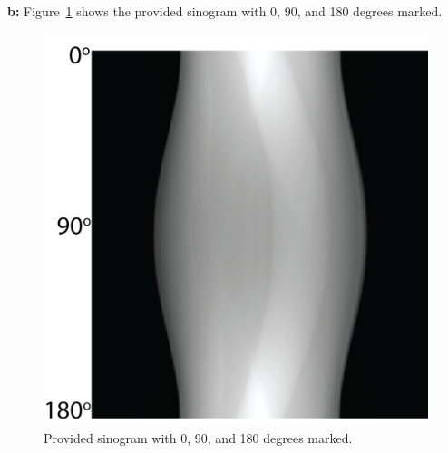 \documentclass[12pt]{article}
\begin{document}
\noindent\textbf{b: }
Figure~\ref{sino} shows the provided sinogram with 0, 90, and 180 degrees marked.
\begin{figure}[H]
	
	\includegraphics[width=\textwidth]{sinogram.png}
	\caption{Provided sinogram with 0, 90, and 180 degrees marked.}
	\label{sino}
\end{figure}
\end{document}
